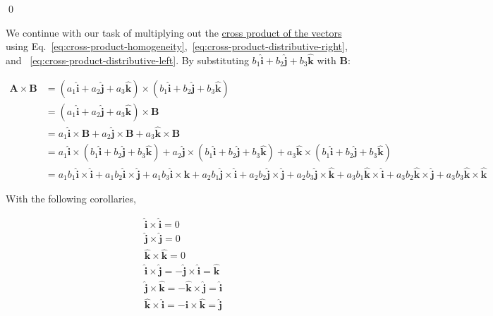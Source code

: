 \qed

We continue with our task of multiplying out the \hyperref[eq:cross-product-of-two]{cross product of the vectors} using
Eq.~\ref{eq:cross-product-homogeneity},~\ref{eq:cross-product-distributive-right}, and ~\ref{eq:cross-product-distributive-left}.
By substituting $b_1\boldsymbol{\hat{i}} + b_2\boldsymbol{\hat{j}} + b_3\boldsymbol{\hat{k}}$ with $\boldsymbol{B}$:

\begin{align}
    \boldsymbol{A} \times \boldsymbol{B} &= (a_1\boldsymbol{\hat{i}} + a_2\boldsymbol{\hat{j}} + a_3\boldsymbol{\hat{k}}) \times (b_1\boldsymbol{\hat{i}} + b_2\boldsymbol{\hat{j}} + b_3\boldsymbol{\hat{k}}) \\
    &= (a_1\boldsymbol{\hat{i}} + a_2\boldsymbol{\hat{j}} + a_3\boldsymbol{\hat{k}}) \times \boldsymbol{B}\label{eq:cross-product-assumed-distributivity} \\
    &= a_1\boldsymbol{\hat{i}} \times \boldsymbol{B} + a_2\boldsymbol{\hat{j}} \times \boldsymbol{B} + a_3\boldsymbol{\hat{k}} \times \boldsymbol{B} \\
    &= a_1\boldsymbol{\hat{i}} \times (b_1\boldsymbol{\hat{i}} + b_2\boldsymbol{\hat{j}} + b_3\boldsymbol{\hat{k}}) + a_2\boldsymbol{\hat{j}} \times (b_1\boldsymbol{\hat{i}} + b_2\boldsymbol{\hat{j}} + b_3\boldsymbol{\hat{k}}) + a_3\boldsymbol{\hat{k}} \times (b_1\boldsymbol{\hat{i}} + b_2\boldsymbol{\hat{j}} + b_3\boldsymbol{\hat{k}}) \\
    &= a_1 b_1 \boldsymbol{\hat{i}} \times \boldsymbol{\hat{i}} + a_1 b_2 \boldsymbol{\hat{i}} \times \boldsymbol{\hat{j}} + a_1 b_3 \boldsymbol{\hat{i}} \times \boldsymbol{\hat{k}} + a_2 b_1 \boldsymbol{\hat{j}} \times \boldsymbol{\hat{i}} + a_2 b_2 \boldsymbol{\hat{j}} \times \boldsymbol{\hat{j}} + a_2 b_3 \boldsymbol{\hat{j}} \times \boldsymbol{\hat{k}} + a_3 b_1 \boldsymbol{\hat{k}} \times \boldsymbol{\hat{i}} + a_3 b_2 \boldsymbol{\hat{k}} \times \boldsymbol{\hat{j}} + a_3 b_3 \boldsymbol{\hat{k}} \times \boldsymbol{\hat{k}}\label{eq:cross-product-complete-expand}
\end{align}

With the following corollaries,

\begin{align}
    \boldsymbol{\hat{i}} \times \boldsymbol{\hat{i}} = 0 \\
    \boldsymbol{\hat{j}} \times \boldsymbol{\hat{j}} = 0 \\
    \boldsymbol{\hat{k}} \times \boldsymbol{\hat{k}} = 0 \\
    \boldsymbol{\hat{i}} \times \boldsymbol{\hat{j}} = -\boldsymbol{\hat{j}} \times \boldsymbol{\hat{i}} = \boldsymbol{\hat{k}} \\
    \boldsymbol{\hat{j}} \times \boldsymbol{\hat{k}} = -\boldsymbol{\hat{k}} \times \boldsymbol{\hat{j}} = \boldsymbol{\hat{i}} \\
    \boldsymbol{\hat{k}} \times \boldsymbol{\hat{i}} = -\boldsymbol{\hat{i}} \times \boldsymbol{\hat{k}} = \boldsymbol{\hat{j}} \\
\end{align}

